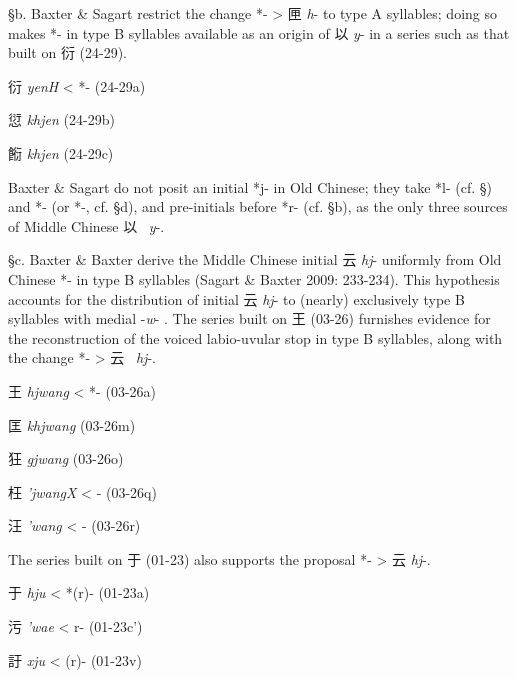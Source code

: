 §b. Baxter \& Sagart restrict the change *{}- \textgreater{} 匣 \emph{h}-
to type A syllables; doing so makes *{}- in type B syllables available as
an origin of 以 \emph{y}- in a series such as that built on 衍 (24-29).

\begin{description} \item
衍  \emph{yenH} \textless{} *{}- (24-29a)

\item
愆  \emph{khjen} (24-29b)

\item
餰 \emph{khjen} (24-29c)
\end{description}

Baxter \& Sagart do not posit an initial *j- in Old Chinese; they take
*l- (cf. §) and *{}- (or *{}-, cf. §d), and pre-initials before *r- (cf.
§b), as the only three sources of Middle Chinese 以~ \emph{y}-.

§c. Baxter \& Baxter derive the Middle Chinese initial 云 \emph{hj}-
uniformly from Old Chinese *{}- in type B syllables (Sagart \& Baxter
2009: 233-234). This hypothesis accounts for the distribution of initial
云 \emph{hj}- to (nearly) exclusively type B syllables with medial
-\emph{w}- 
\citep[209]{Baxter1992}. The series built on 王 (03-26) furnishes
evidence for the reconstruction of the voiced labio-uvular stop in type
B syllables, along with the change *{}- \textgreater{} 云~ \emph{hj}-.

\begin{description} \item
王  \emph{hjwang} \textless{} *{}- (03-26a)
\item
匡  \emph{khjwang} (03-26m)
\item
狂  \emph{gjwang} (03-26o)
\item
枉  \emph{'jwangX} \textless{} {}- (03-26q)
\item
汪  \emph{'wang} \textless{} {}- (03-26r)
\end{description}

The series built on 于 (01-23) also supports the proposal *{}-
\textgreater{} 云  \emph{hj}-.

\begin{description} \item
于 \emph{hju} \textless{} *{}(r)- (01-23a)
\item
污  \emph{'wae} \textless{} {}r- (01-23c')
\item
訏 \emph{xju} \textless{} {}(r)- (01-23v)
\end{description}


